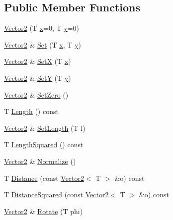 \subsection*{Public Member Functions}
\begin{DoxyCompactItemize}
\item 
\hyperlink{classastu_1_1Vector2_a021ec0e80fa7ca80921a17172e30fe29}{Vector2} (T \hyperlink{classastu_1_1Vector2_aa60c30b27742255fbe7053b07a7e76ba}{x}=0, T \hyperlink{classastu_1_1Vector2_a6718f5a7005c38830dbd31283a87f5c9}{y}=0)
\item 
\hyperlink{classastu_1_1Vector2}{Vector2} \& \hyperlink{classastu_1_1Vector2_a44e396e8e35cf3c4d1cc50de70b70220}{Set} (T \hyperlink{classastu_1_1Vector2_aa60c30b27742255fbe7053b07a7e76ba}{x}, T \hyperlink{classastu_1_1Vector2_a6718f5a7005c38830dbd31283a87f5c9}{y})
\item 
\hyperlink{classastu_1_1Vector2}{Vector2} \& \hyperlink{classastu_1_1Vector2_adf5c57f8b6f337a4aa6eb79c0506d074}{SetX} (T \hyperlink{classastu_1_1Vector2_aa60c30b27742255fbe7053b07a7e76ba}{x})
\item 
\hyperlink{classastu_1_1Vector2}{Vector2} \& \hyperlink{classastu_1_1Vector2_af454152e76948f63a433a6343b5abaef}{SetY} (T \hyperlink{classastu_1_1Vector2_a6718f5a7005c38830dbd31283a87f5c9}{y})
\item 
\hyperlink{classastu_1_1Vector2}{Vector2} \& \hyperlink{classastu_1_1Vector2_a70eb8d4b44d3f973c5065a0ed5f9c01c}{Set\+Zero} ()
\item 
T \hyperlink{classastu_1_1Vector2_ab195006315ba4e54f6e89e01727dbd08}{Length} () const
\item 
\hyperlink{classastu_1_1Vector2}{Vector2} \& \hyperlink{classastu_1_1Vector2_afeae7c216e2c0846f576a11563a6404c}{Set\+Length} (T l)
\item 
T \hyperlink{classastu_1_1Vector2_a42ff8efbc4747ec1042867e30e565311}{Length\+Squared} () const
\item 
\hyperlink{classastu_1_1Vector2}{Vector2} \& \hyperlink{classastu_1_1Vector2_aedecfe4d0a04bb6e3b6dd94caa16e911}{Normalize} ()
\item 
T \hyperlink{classastu_1_1Vector2_a504029e7043988ec1e697b1a1e2cfb78}{Distance} (const \hyperlink{classastu_1_1Vector2}{Vector2}$<$ T $>$ \&o) const
\item 
T \hyperlink{classastu_1_1Vector2_ac60cbccfefd62216f648c388c5025649}{Distance\+Squared} (const \hyperlink{classastu_1_1Vector2}{Vector2}$<$ T $>$ \&o) const
\item 
\hyperlink{classastu_1_1Vector2}{Vector2} \& \hyperlink{classastu_1_1Vector2_ac2b10a554fede91faa5a0668ebe76697}{Rotate} (T phi)

\end{DoxyCompactItemize}
